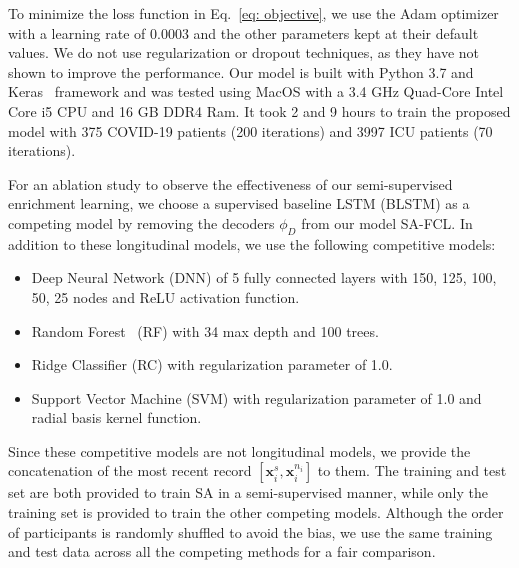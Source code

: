To minimize the loss function in Eq.~\eqref{eq: objective}, we use the Adam optimizer~\cite{kingma2014adam} with a learning rate of 0.0003 and the other parameters kept at their default values. We do not use regularization or dropout techniques, as they have not shown to improve the performance. Our model is built with Python 3.7 and Keras~\cite{chollet2015keras} framework and was tested using MacOS with a 3.4 GHz Quad-Core Intel Core i5 CPU and 16 GB DDR4 Ram. It took 2 and 9 hours to train the proposed model with 375 COVID-19 patients (200 iterations) and 3997 ICU patients (70 iterations).

For an ablation study to observe the effectiveness of our semi-supervised enrichment learning, we choose a supervised baseline LSTM (BLSTM) as a competing model by removing the decoders $\phi_{D}$ from our model SA-FCL. In addition to these longitudinal models, we use the following competitive models:
\begin{itemize}
    \item Deep Neural Network (DNN) of 5 fully connected layers with 150, 125, 100, 50, 25 nodes and ReLU activation function.
    \item Random Forest~\cite{ho1995random} (RF) with 34 max depth and 100 trees.
    \item Ridge Classifier (RC) with regularization parameter of 1.0.
    \item Support Vector Machine (SVM) with regularization parameter of 1.0 and radial basis kernel function.
\end{itemize}
Since these competitive models are not longitudinal models, we provide the concatenation of the most recent record $[\mathbf{x}_i^s, \mathbf{x}_i^{n_i}]$ to them. The training and test set are both provided to train SA in a semi-supervised manner, while only the training set is provided to train the other competing models. Although the order of participants is randomly shuffled to avoid the bias, we use the same training and test data across all the competing methods for a fair comparison.

